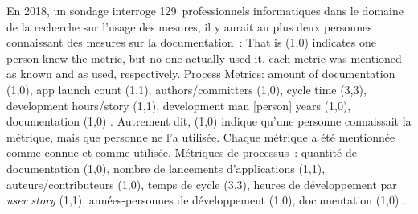 {En 2018, un sondage interroge 129~professionnels informatiques dans le domaine de la recherche sur l'usage des mesures, il y aurait au plus deux personnes connaissant des mesures sur la documentation~: 
\quoteenfr
{That is (1,0) indicates one person knew the metric, but no one actually used it. each metric was mentioned as known and as used, respectively.
\elide
Process Metrics: amount of documentation (1,0), app launch count (1,1), authors/committers (1,0), cycle time (3,3), development hours/story (1,1), development man [person] years (1,0), documentation (1,0) \elide.}
{Autrement dit, (1,0) indique qu'une personne connaissait la métrique, mais que personne ne l'a utilisée. Chaque métrique a été mentionnée comme connue et comme utilisée.
\elide Métriques de processus~: quantité de documentation (1,0), nombre de lancements d'applications (1,1), auteurs/contributeurs (1,0), temps de cycle (3,3), heures de développement par \textit{user story} (1,1), années-personnes de développement (1,0), documentation (1,0) \elide.}
{\cite{eisty_survey_2018}}
\vspace{-1\baselineskip}
}{}

